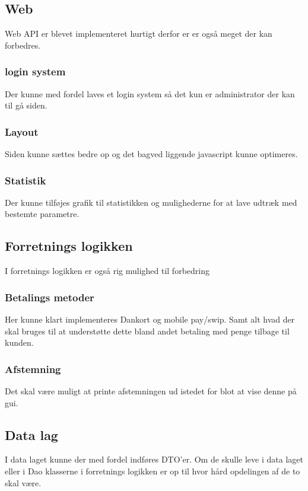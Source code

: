 \subsection{Web}
Web \gls{API} er blevet implementeret hurtigt derfor er er også meget der kan forbedres.

\subsubsection{login system}
Der kunne med fordel laves et login system så det kun er administrator der kan til gå siden.

\subsubsection{Layout}
Siden kunne sættes bedre op og det bagved liggende javascript kunne optimeres.

\subsubsection{Statistik}
Der kunne tilføjes grafik til statistikken og mulighederne for at lave udtræk med bestemte parametre.

\subsection{Forretnings logikken}
I forretnings logikken er også rig mulighed til forbedring

\subsubsection{Betalings metoder}
Her kunne klart implementeres Dankort og mobile pay/swip. 
Samt alt hvad der skal bruges til at understøtte dette bland andet betaling med penge tilbage til kunden.

\subsubsection{Afstemning}
Det skal være muligt at printe afstemningen ud istedet for blot at vise denne på gui. 

\subsection{Data lag}
I data laget kunne der med fordel indføres \gls{DTO}'er. Om de skulle leve i data laget eller i \gls{Dao} klasserne i forretnings logikken er op til hvor hård opdelingen af de to skal være.